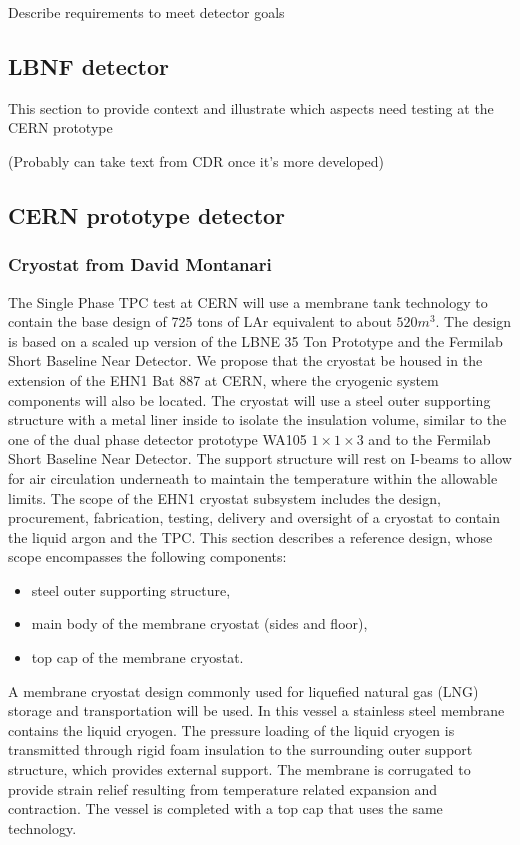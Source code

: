 Describe requirements to meet detector goals

\subsection{LBNF detector}
This section to provide context and illustrate which aspects need testing at the CERN prototype

(Probably can take text from CDR once it's more developed)

\subsection{CERN prototype detector}

\subsubsection{Cryostat from David Montanari}
The Single Phase TPC test at CERN will use a membrane tank technology to contain the base design of 725 tons of LAr equivalent to about $520 m^3$. The design is based on a scaled up version of the LBNE 35 Ton Prototype and the Fermilab Short Baseline Near Detector. We propose that the cryostat be housed in the extension of the EHN1 Bat 887 at CERN, where the cryogenic system components will also be located. The cryostat will use a steel outer supporting structure with a metal liner inside to isolate the insulation volume, similar to the one of the dual phase detector prototype WA105 $1\times1\times3$ and to the Fermilab Short Baseline Near Detector. The support structure will rest on I-beams to allow for air circulation underneath to maintain the temperature within the allowable limits.
The scope of the EHN1 cryostat subsystem includes the design, procurement, fabrication, testing, delivery and oversight of a cryostat to contain the liquid argon and the TPC. This section describes a reference design, whose scope encompasses the following components:

\begin{itemize}
\item steel outer supporting structure,
\item main body of the membrane cryostat (sides and floor), 
\item top cap of the membrane cryostat.
\end{itemize}

A membrane cryostat design commonly used for liquefied natural gas (LNG) storage and transportation will be used. In this vessel a stainless steel membrane contains the liquid cryogen. The pressure loading of the liquid cryogen is transmitted through rigid foam insulation to the surrounding outer support structure, which provides external support. The membrane is corrugated to provide strain relief resulting from temperature related expansion and contraction. The vessel is completed with a top cap that uses the same technology.

